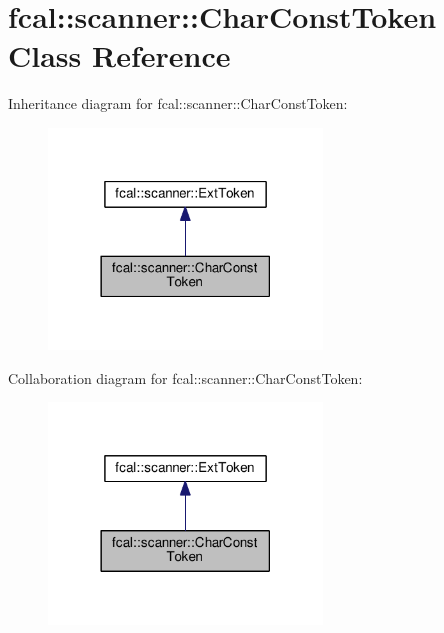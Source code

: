 \hypertarget{classfcal_1_1scanner_1_1CharConstToken}{}\section{fcal\+:\+:scanner\+:\+:Char\+Const\+Token Class Reference}
\label{classfcal_1_1scanner_1_1CharConstToken}


Inheritance diagram for fcal\+:\+:scanner\+:\+:Char\+Const\+Token\+:
\nopagebreak
\begin{figure}[H]
\begin{center}
\leavevmode
\includegraphics[width=206pt]{classfcal_1_1scanner_1_1CharConstToken__inherit__graph}
\end{center}
\end{figure}


Collaboration diagram for fcal\+:\+:scanner\+:\+:Char\+Const\+Token\+:
\nopagebreak
\begin{figure}[H]
\begin{center}
\leavevmode
\includegraphics[width=206pt]{classfcal_1_1scanner_1_1CharConstToken__coll__graph}
\end{center}
\end{figure}
